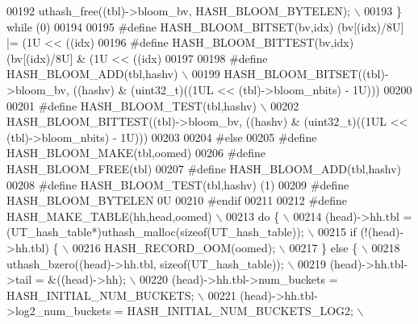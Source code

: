 \begin{DoxyCode}
{00192 \textcolor{preprocessor}{  uthash\_free((tbl)->bloom\_bv, HASH\_BLOOM\_BYTELEN);                              \(\backslash\)}
00193 \textcolor{preprocessor}{\} while (0)}
00194 
00195 \textcolor{preprocessor}{#define HASH\_BLOOM\_BITSET(bv,idx) (bv[(idx)/8U] |= (1U << ((idx)%
00196 \textcolor{preprocessor}{#define HASH\_BLOOM\_BITTEST(bv,idx) (bv[(idx)/8U] & (1U << ((idx)%
00197 
00198 \textcolor{preprocessor}{#define HASH\_BLOOM\_ADD(tbl,hashv)                                                \(\backslash\)}
00199 \textcolor{preprocessor}{  HASH\_BLOOM\_BITSET((tbl)->bloom\_bv, ((hashv) & (uint32\_t)((1UL << (tbl)->bloom\_nbits) - 1U)))}
00200 
00201 \textcolor{preprocessor}{#define HASH\_BLOOM\_TEST(tbl,hashv)                                               \(\backslash\)}
00202 \textcolor{preprocessor}{  HASH\_BLOOM\_BITTEST((tbl)->bloom\_bv, ((hashv) & (uint32\_t)((1UL << (tbl)->bloom\_nbits) - 1U)))}
00203 
00204 \textcolor{preprocessor}{#else}
00205 \textcolor{preprocessor}{#define HASH\_BLOOM\_MAKE(tbl,oomed)}
00206 \textcolor{preprocessor}{#define HASH\_BLOOM\_FREE(tbl)}
00207 \textcolor{preprocessor}{#define HASH\_BLOOM\_ADD(tbl,hashv)}
00208 \textcolor{preprocessor}{#define HASH\_BLOOM\_TEST(tbl,hashv) (1)}
00209 \textcolor{preprocessor}{#define HASH\_BLOOM\_BYTELEN 0U}
00210 \textcolor{preprocessor}{#endif}
00211 
00212 \textcolor{preprocessor}{#define HASH\_MAKE\_TABLE(hh,head,oomed)                                           \(\backslash\)}
00213 \textcolor{preprocessor}{do \{                                                                             \(\backslash\)}
00214 \textcolor{preprocessor}{  (head)->hh.tbl = (UT\_hash\_table*)uthash\_malloc(sizeof(UT\_hash\_table));         \(\backslash\)}
00215 \textcolor{preprocessor}{  if (!(head)->hh.tbl) \{                                                         \(\backslash\)}
00216 \textcolor{preprocessor}{    HASH\_RECORD\_OOM(oomed);                                                      \(\backslash\)}
00217 \textcolor{preprocessor}{  \} else \{                                                                       \(\backslash\)}
00218 \textcolor{preprocessor}{    uthash\_bzero((head)->hh.tbl, sizeof(UT\_hash\_table));                         \(\backslash\)}
00219 \textcolor{preprocessor}{    (head)->hh.tbl->tail = &((head)->hh);                                        \(\backslash\)}
00220 \textcolor{preprocessor}{    (head)->hh.tbl->num\_buckets = HASH\_INITIAL\_NUM\_BUCKETS;                      \(\backslash\)}
00221 \textcolor{preprocessor}{    (head)->hh.tbl->log2\_num\_buckets = HASH\_INITIAL\_NUM\_BUCKETS\_LOG2;            \(\backslash\)}
}}}
\end{DoxyCode}
